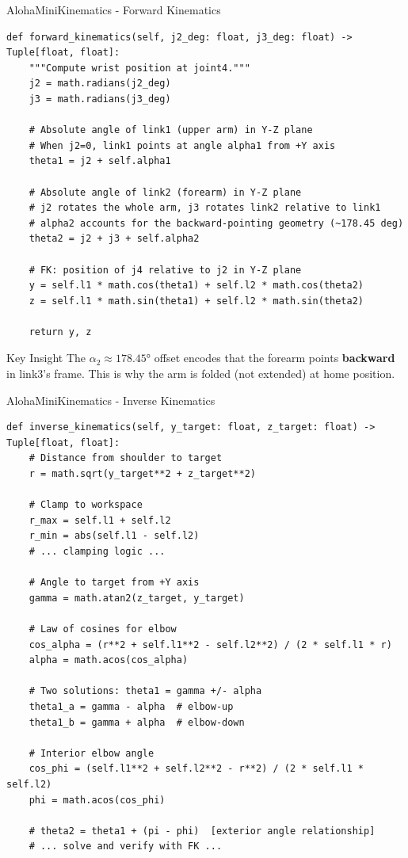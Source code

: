 \begin{frame}[fragile]{AlohaMiniKinematics - Forward Kinematics}
\begin{lstlisting}
def forward_kinematics(self, j2_deg: float, j3_deg: float) -> Tuple[float, float]:
    """Compute wrist position at joint4."""
    j2 = math.radians(j2_deg)
    j3 = math.radians(j3_deg)

    # Absolute angle of link1 (upper arm) in Y-Z plane
    # When j2=0, link1 points at angle alpha1 from +Y axis
    theta1 = j2 + self.alpha1

    # Absolute angle of link2 (forearm) in Y-Z plane
    # j2 rotates the whole arm, j3 rotates link2 relative to link1
    # alpha2 accounts for the backward-pointing geometry (~178.45 deg)
    theta2 = j2 + j3 + self.alpha2

    # FK: position of j4 relative to j2 in Y-Z plane
    y = self.l1 * math.cos(theta1) + self.l2 * math.cos(theta2)
    z = self.l1 * math.sin(theta1) + self.l2 * math.sin(theta2)

    return y, z
\end{lstlisting}

\begin{block}{Key Insight}
The $\alpha_2 \approx 178.45°$ offset encodes that the forearm points \textbf{backward} in link3's frame. This is why the arm is folded (not extended) at home position.
\end{block}
\end{frame}

\begin{frame}[fragile]{AlohaMiniKinematics - Inverse Kinematics}
\begin{lstlisting}
def inverse_kinematics(self, y_target: float, z_target: float) -> Tuple[float, float]:
    # Distance from shoulder to target
    r = math.sqrt(y_target**2 + z_target**2)

    # Clamp to workspace
    r_max = self.l1 + self.l2
    r_min = abs(self.l1 - self.l2)
    # ... clamping logic ...

    # Angle to target from +Y axis
    gamma = math.atan2(z_target, y_target)

    # Law of cosines for elbow
    cos_alpha = (r**2 + self.l1**2 - self.l2**2) / (2 * self.l1 * r)
    alpha = math.acos(cos_alpha)

    # Two solutions: theta1 = gamma +/- alpha
    theta1_a = gamma - alpha  # elbow-up
    theta1_b = gamma + alpha  # elbow-down

    # Interior elbow angle
    cos_phi = (self.l1**2 + self.l2**2 - r**2) / (2 * self.l1 * self.l2)
    phi = math.acos(cos_phi)

    # theta2 = theta1 + (pi - phi)  [exterior angle relationship]
    # ... solve and verify with FK ...
\end{lstlisting}
\end{frame}

